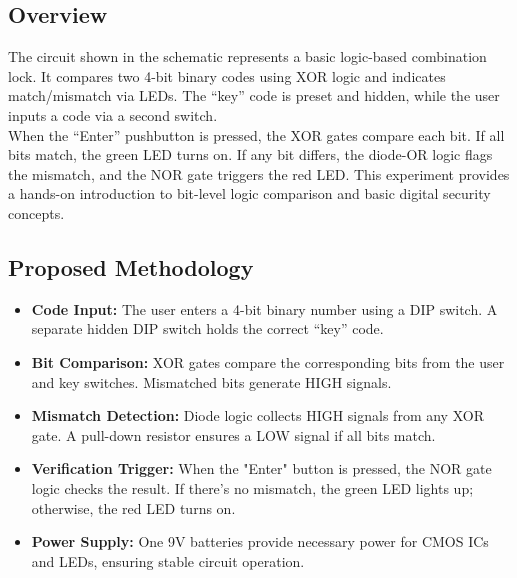 \subsection{Overview}
The circuit shown in the schematic represents a basic logic-based combination lock. It compares two 4-bit binary codes using XOR logic and indicates match/mismatch via LEDs. The “key” code is preset and hidden, while the user inputs a code via a second switch.\\
When the “Enter” pushbutton is pressed, the XOR gates compare each bit. If all bits match, the green LED turns on. If any bit differs, the diode-OR logic flags the mismatch, and the NOR gate triggers the red LED. This experiment provides a hands-on introduction to bit-level logic comparison and basic digital security concepts.\cite{2.1.3}

\subsection{Proposed Methodology}
\begin{itemize}
\item \textbf{Code Input:} The user enters a 4-bit binary number using a DIP switch. A separate hidden DIP switch holds the correct “key” code.
\item \textbf{Bit Comparison:} XOR gates compare the corresponding bits from the user and key switches. Mismatched bits generate HIGH signals.
\item \textbf{Mismatch Detection:} Diode logic collects HIGH signals from any XOR gate. A pull-down resistor ensures a LOW signal if all bits match.
\item\textbf{Verification Trigger:} When the "Enter" button is pressed, the NOR gate logic checks the result. If there's no mismatch, the green LED lights up; otherwise, the red LED turns on.
\item\textbf{Power Supply:} One 9V batteries provide necessary power for CMOS ICs and LEDs, ensuring stable circuit operation.\cite{2.1.1}
\end{itemize}


